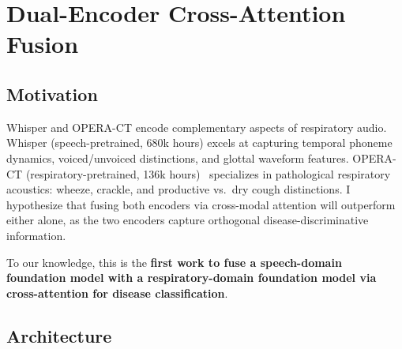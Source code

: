 \documentclass[10pt,journal,compsoc]{IEEEtran}
\begin{document}
\section{Dual-Encoder Cross-Attention Fusion}
\label{sec:dual}

\subsection{Motivation}

Whisper and OPERA-CT encode complementary aspects of respiratory audio.
Whisper (speech-pretrained, 680k hours) excels at capturing temporal
phoneme dynamics, voiced/unvoiced distinctions, and glottal waveform
features. OPERA-CT (respiratory-pretrained, 136k hours)~\cite{opera}
specializes in pathological respiratory acoustics: wheeze, crackle,
and productive vs.\ dry cough distinctions.
I hypothesize that fusing both encoders via cross-modal attention
will outperform either alone, as the two encoders capture orthogonal
disease-discriminative information.

To our knowledge, this is the \textbf{first work to fuse a
speech-domain foundation model with a respiratory-domain foundation
model via cross-attention for disease classification}.

\subsection{Architecture}
\end{document}
